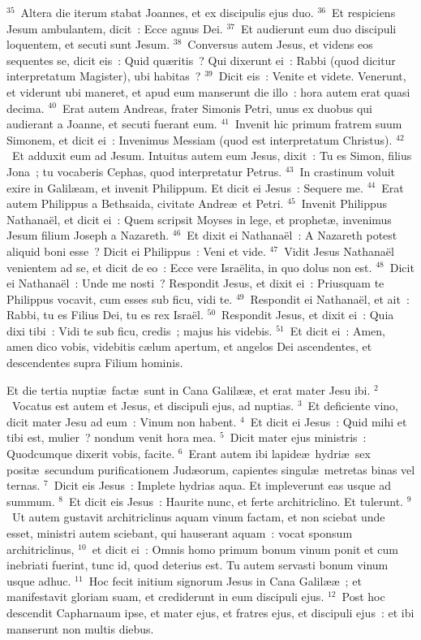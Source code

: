 ${}^{35}$~Altera die iterum stabat Joannes, et ex discipulis ejus duo.
${}^{36}$~Et respiciens Jesum ambulantem, dicit~: Ecce agnus Dei.
${}^{37}$~Et audierunt eum duo discipuli loquentem, et secuti sunt Jesum.
${}^{38}$~Conversus autem Jesus, et videns eos sequentes se, dicit eis~: Quid qu\ae ritis~? Qui dixerunt ei~: Rabbi (quod dicitur interpretatum Magister), ubi habitas~?
${}^{39}$~Dicit eis~: Venite et videte. Venerunt, et viderunt ubi maneret, et apud eum manserunt die illo~: hora autem erat quasi decima.
${}^{40}$~Erat autem Andreas, frater Simonis Petri, unus ex duobus qui audierant a Joanne, et secuti fuerant eum.
${}^{41}$~Invenit hic primum fratrem suum Simonem, et dicit ei~: Invenimus Messiam (quod est interpretatum Christus).
${}^{42}$~Et adduxit eum ad Jesum. Intuitus autem eum Jesus, dixit~: Tu es Simon, filius Jona~; tu vocaberis Cephas, quod interpretatur Petrus.
${}^{43}$~In crastinum voluit exire in Galil\ae am, et invenit Philippum. Et dicit ei Jesus~: Sequere me.
${}^{44}$~Erat autem Philippus a Bethsaida, civitate Andre\ae\ et Petri.
${}^{45}$~Invenit Philippus Nathana\"el, et dicit ei~: Quem scripsit Moyses in lege, et prophet\ae , invenimus Jesum filium Joseph a Nazareth.
${}^{46}$~Et dixit ei Nathana\"el~: A Nazareth potest aliquid boni esse~? Dicit ei Philippus~: Veni et vide.
${}^{47}$~Vidit Jesus Nathana\"el venientem ad se, et dicit de eo~: Ecce vere Isra\"elita, in quo dolus non est.
${}^{48}$~Dicit ei Nathana\"el~: Unde me nosti~? Respondit Jesus, et dixit ei~: Priusquam te Philippus vocavit, cum esses sub ficu, vidi te.
${}^{49}$~Respondit ei Nathana\"el, et ait~: Rabbi, tu es Filius Dei, tu es rex Isra\"el.
${}^{50}$~Respondit Jesus, et dixit ei~: Quia dixi tibi~: Vidi te sub ficu, credis~; majus his videbis.
${}^{51}$~Et dicit ei~: Amen, amen dico vobis, videbitis c\ae lum apertum, et angelos Dei ascendentes, et descendentes supra Filium hominis.

\lettrine[lines=10,image=true,loversize=0.05,lraise=-0.03]{E}{}t die tertia nupti\ae\ fact\ae\ sunt in Cana Galil\ae \ae , et erat mater Jesu ibi.
${}^{2}$~Vocatus est autem et Jesus, et discipuli ejus, ad nuptias.
${}^{3}$~Et deficiente vino, dicit mater Jesu ad eum~: Vinum non habent.
${}^{4}$~Et dicit ei Jesus~: Quid mihi et tibi est, mulier~? nondum venit hora mea.
${}^{5}$~Dicit mater ejus ministris~: Quodcumque dixerit vobis, facite.
${}^{6}$~Erant autem ibi lapide\ae\ hydri\ae\ sex posit\ae\ secundum purificationem Jud\ae orum, capientes singul\ae\ metretas binas vel ternas.
${}^{7}$~Dicit eis Jesus~: Implete hydrias aqua. Et impleverunt eas usque ad summum.
${}^{8}$~Et dicit eis Jesus~: Haurite nunc, et ferte architriclino. Et tulerunt.
${}^{9}$~Ut autem gustavit architriclinus aquam vinum factam, et non sciebat unde esset, ministri autem sciebant, qui hauserant aquam~: vocat sponsum architriclinus,
${}^{10}$~et dicit ei~: Omnis homo primum bonum vinum ponit et cum inebriati fuerint, tunc id, quod deterius est. Tu autem servasti bonum vinum usque adhuc.
${}^{11}$~Hoc fecit initium signorum Jesus in Cana Galil\ae \ae~; et manifestavit gloriam suam, et crediderunt in eum discipuli ejus.
${}^{12}$~Post hoc descendit Capharnaum ipse, et mater ejus, et fratres ejus, et discipuli ejus~: et ibi manserunt non multis diebus.


